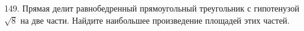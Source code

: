 149. Прямая делит равнобедренный прямоугольный треугольник с гипотенузой $\sqrt{8}$ на две части. Найдите наибольшее произведение площадей этих частей.\\
